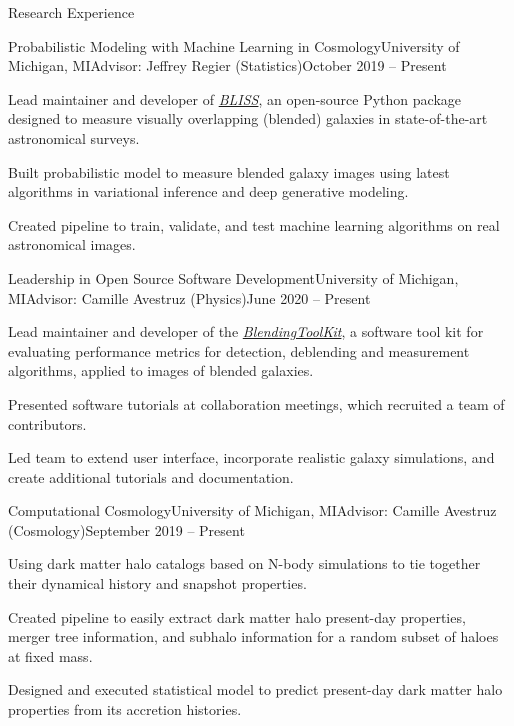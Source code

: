 \begin{rSection}{Research Experience}

\begin{rSubsection}{Probabilistic Modeling with Machine Learning in Cosmology}{University of Michigan, MI}{Advisor: Jeffrey Regier (Statistics)}{October 2019 -- Present}
\item Lead maintainer and developer of \textit{\href{https://github.com/prob-ml/bliss}{BLISS}}, an open-source Python package designed to measure visually overlapping (blended) galaxies in state-of-the-art astronomical surveys.
\item Built probabilistic model to measure blended galaxy images using latest algorithms in variational inference and deep generative modeling.
\item Created pipeline to train, validate, and test machine learning algorithms on real astronomical images.
\end{rSubsection}

\begin{rSubsection}{Leadership in Open Source Software Development}{University of Michigan, MI}{Advisor: Camille Avestruz (Physics)}{June 2020 -- Present}
\item Lead maintainer and developer of the \textit{\href{https://github.com/LSSTDESC/BlendingToolKit}{BlendingToolKit}}, a software tool kit for evaluating performance metrics for detection, deblending and measurement algorithms, applied to images of blended galaxies.

\item Presented software tutorials at collaboration meetings, which recruited a team of contributors.

\item Led team to extend user interface, incorporate realistic galaxy simulations, and create additional tutorials and documentation.
\end{rSubsection}

\begin{rSubsection}{Computational Cosmology}{University of Michigan, MI}{Advisor: Camille Avestruz (Cosmology)}{September 2019 -- Present}
\item Using dark matter halo catalogs based on N-body simulations to tie together their dynamical history and snapshot properties. 
\item Created pipeline to easily extract dark matter halo present-day properties, merger tree information, and subhalo information for a random subset of haloes at fixed mass.
\item Designed and executed statistical model to predict present-day dark matter halo properties from its accretion histories.
\end{rSubsection}


\end{rSection}
